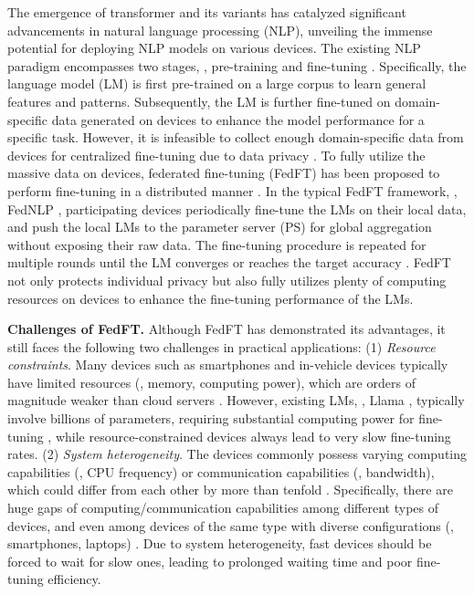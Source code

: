 \vspace{-0.2cm}
The emergence of transformer \cite{vaswani2017attention} and its variants \cite{bai2020binarybert, devlin2018bert, hou2020dynabert} has catalyzed significant advancements in natural language processing (NLP), unveiling the immense potential for deploying NLP models on various devices.
The existing NLP paradigm encompasses two stages, \ie, pre-training and fine-tuning \cite{brown2020language, devlin2018bert}. 
Specifically, the language model (LM) is first pre-trained on a large corpus to learn general features and patterns. 
Subsequently, the LM is further fine-tuned on domain-specific data generated on devices to enhance the model performance for a specific task. 
However, it is infeasible to collect enough domain-specific data from devices for centralized fine-tuning due to data privacy \cite{mcmahan2017communication, lin2021fednlp, liao2023accelerating}. 
To fully utilize the massive data on devices, federated fine-tuning (FedFT) has been proposed to perform fine-tuning in a distributed manner \cite{lin2021fednlp}.
In the typical FedFT framework, \eg, FedNLP \cite{lin2021fednlp}, participating devices periodically fine-tune the LMs on their local data, and push the local LMs to the parameter server (PS) for global aggregation without exposing their raw data.
The fine-tuning procedure is repeated for multiple rounds until the LM converges or reaches the target accuracy \cite{mcmahan2017communication, stremmel2021pretraining, cai2022fedadapter}.
FedFT not only protects individual privacy but also fully utilizes plenty of computing resources on devices to enhance the fine-tuning performance of the LMs.

\textbf{Challenges of FedFT.}
Although FedFT has demonstrated its advantages, it still faces the following two challenges in practical applications: 
(1) \textit{Resource constraints}. 
Many devices such as smartphones and in-vehicle devices typically have limited resources (\eg, memory, computing power), which are orders of magnitude weaker than cloud servers \cite{xu2022adaptive, zhu2023pockengine, dhar2021survey, liao2024mergesfl}. 
However, existing LMs, \eg, Llama \cite{touvron2023llama}, typically involve billions of parameters, requiring substantial computing power for fine-tuning \cite{hu2021lora}, while resource-constrained devices always lead to very slow fine-tuning rates.
(2) \textit{System heterogeneity}.
The devices commonly possess varying computing capabilities (\eg, CPU frequency) or communication capabilities (\eg, bandwidth), which could differ from each other by more than tenfold \cite{liao2023adaptive, lai2021oort, liu2023yoga}.
Specifically, there are huge gaps of computing/communication capabilities among different types of devices, and even among devices of the same type with diverse configurations (\eg, smartphones, laptops) \cite{dhar2021survey}.
Due to system heterogeneity, fast devices should be forced to wait for slow ones, leading to prolonged waiting time and poor fine-tuning efficiency.

